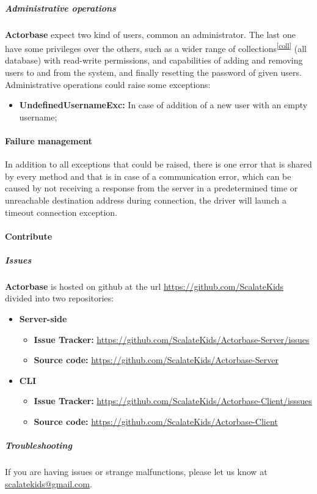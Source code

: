 \documentclass{scalatekids-article}
\begin{document}
\subparagraph{Administrative operations}

\textbf{Actorbase} expect two kind of users, common an administrator. The last one have
some privileges over the others, such as a wider range of collections\textsuperscript{\ref{coll}} (all
database) with read-write permissions, and capabilities of adding and removing
users to and from the system, and finally resetting the password of given users.
Administrative operations could raise some exceptions:
\begin{itemize}
\item \textbf{UndefinedUsernameExc:} In case of addition of a new user with an empty username;
\end{itemize}

\paragraph{Failure management}

In addition to all exceptions that could be raised, there is one error that is
shared by every method and that is in case of a communication error, which can
be caused by not receiving a response from the server in a predetermined time or
unreachable destination address during connection, the driver will launch a
timeout connection exception.

\paragraph{Contribute}

\subparagraph{Issues}

\textbf{Actorbase} is hosted on github at the url
\url{https://github.com/ScalateKids} divided into two repositories:

\begin{itemize}
\item\textbf{Server-side}
  \begin{itemize}
  \item \textbf{Issue Tracker:} \url{https://github.com/ScalateKids/Actorbase-Server/issues}
  \item \textbf{Source code:} \url{https://github.com/ScalateKids/Actorbase-Server}
  \end{itemize}
\item\textbf{CLI}
  \begin{itemize}
  \item \textbf{Issue Tracker:} \url{https://github.com/ScalateKids/Actorbase-Client/isssues}
  \item \textbf{Source code:} \url{https://github.com/ScalateKids/Actorbase-Client}
  \end{itemize}
\end{itemize}

\subparagraph{Troubleshooting}

If you are having issues or strange malfunctions, please let us know at
\href{mailto:scalatekids@gmail.com}{scalatekids@gmail.com}.
\end{document}
